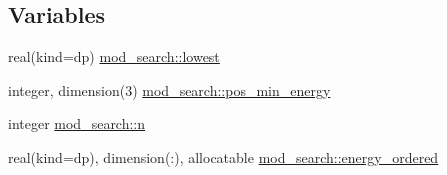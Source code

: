 \subsection*{Variables}
\begin{DoxyCompactItemize}
\item 
real(kind=dp) \hyperlink{namespacemod__search_a014567a8f5474b311cedf2f9b1dbda1a}{mod\+\_\+search\+::lowest}
\item 
integer, dimension(3) \hyperlink{namespacemod__search_a018a3c64ea9e25b0dfc15ebe763920cf}{mod\+\_\+search\+::pos\+\_\+min\+\_\+energy}
\item 
integer \hyperlink{namespacemod__search_a0c7388c12d8e6a95b8c3f9fd86321687}{mod\+\_\+search\+::n}
\item 
real(kind=dp), dimension(\+:), allocatable \hyperlink{namespacemod__search_a8ce72764a5658f7958ed5c473dd77706}{mod\+\_\+search\+::energy\+\_\+ordered}
\end{DoxyCompactItemize}
